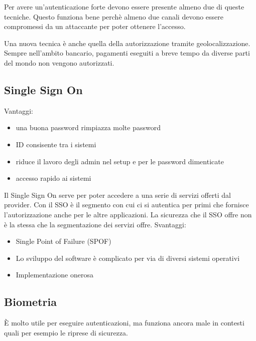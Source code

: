 Per avere un'autenticazione forte devono essere presente almeno due di queste
tecniche. Questo funziona bene perchè almeno due canali devono essere
compromessi da un attaccante per poter ottenere l'accesso.

Una nuova tecnica è anche quella della autorizzazione tramite
geolocalizzazione. Sempre nell'ambito bancario, pagamenti eseguiti a breve
tempo da diverse parti del mondo non vengono autorizzati.

\subsection{Single Sign On}

Vantaggi:
\begin{itemize}
\item una buona password rimpiazza molte password
\item ID consisente tra i sistemi
\item riduce il lavoro degli admin nel setup e per le password dimenticate
\item accesso rapido ai sistemi
\end{itemize}


Il Single Sign On serve per poter accedere a una serie di servizi offerti dal
provider. Con il SSO è il segmento con cui ci si autentica per primi che
fornisce l'autorizzazione anche per le altre applicazioni.
La sicurezza che il SSO offre non è la stessa che la segmentazione dei servizi
offre.
Svantaggi:
\begin{itemize}
\item Single Point of Failure (SPOF) 
\item Lo sviluppo del software è complicato per via di diversi sistemi operativi
\item Implementazione onerosa
\end{itemize}


\subsection{Biometria}

È molto utile per eseguire autenticazioni, ma funziona ancora male in contesti
quali per esempio le riprese di sicurezza.

